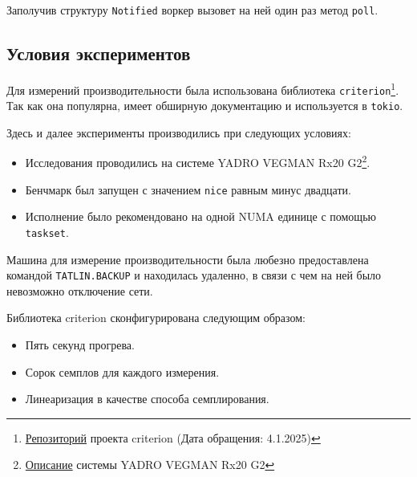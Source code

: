 Заполучив структуру \verb|Notified| воркер вызовет на ней один раз метод \verb|poll|.

\subsection{Условия экспериментов}

Для измерений производительности была использована библиотека \verb|criterion|\footnote{\href{https://github.com/bheisler/criterion.rs}{Репозиторий} проекта criterion (Дата обращения: 4.1.2025)}. Так как она популярна, имеет обширную документацию и используется в \verb|tokio|.

Здесь и далее эксперименты производились при следующих условиях:

\begin{itemize}
    \item Исследования проводились на системе YADRO VEGMAN Rx20 G2\footnote{\href{https://yadro.com/ru/vegman/rx20g2/specs}{Описание} системы YADRO VEGMAN Rx20 G2}.
    \item Бенчмарк был запущен с значением \verb|nice| равным минус двадцати.
    \item Исполнение было рекомендовано на одной NUMA единице с помощью \verb|taskset|.
\end{itemize}

Машина для измерение производительности была любезно предоставлена командой \verb|TATLIN.BACKUP| и находилась удаленно, в связи с чем на ней было невозможно отключение сети.

Библиотека criterion сконфигурирована следующим образом:

\begin{itemize}
    \item Пять секунд прогрева.
    \item Сорок семплов для каждого измерения.
    \item Линеаризация в качестве способа семплирования.
\end{itemize}

